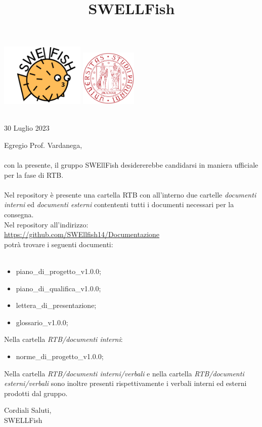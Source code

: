 \documentclass[12pt]{article}
\begin{document}
\graphicspath{ {../templates/img/} }
\title{SWELLFish}

\begin{center}
    \includegraphics[width=0.3\textwidth]{../templates/img/Swellfish_logo.png}
    \hspace{3cm}
    \includegraphics[width=0.2\textwidth]{../templates/img/logoUnipd.png}\\
    \end{center}
    \begin{flushright}
        \
        \textbf{}\\
        30 Luglio 2023
    \end{flushright}  

Egregio Prof. Vardanega,\\\\
con la presente, il gruppo SWEllFish desidererebbe candidarsi in maniera ufficiale
per la fase di RTB.\\\\
Nel repository è presente una cartella RTB con all'interno due cartelle \textit{documenti interni} ed \textit{documenti esterni} contententi tutti i documenti necessari per la consegna.\\
Nel repository all'indirizzo: \\
\href{https://github.com/SWEllfish14/Documentazione}{\underline{https://github.com/SWEllfish14/Documentazione}}\\ 
potrà trovare i seguenti documenti:\\\\

\begin{itemize}
\item piano\_di\_progetto\_v1.0.0;
\item piano\_di\_qualifica\_v1.0.0;
\item lettera\_di\_presentazione;
\item glossario\_v1.0.0;
\end{itemize}
Nella cartella \textit{RTB/documenti interni}:
\begin{itemize}
    \item norme\_di\_progetto\_v1.0.0;
\end{itemize}
 Nella cartella \textit{RTB/documenti interni/verbali} e nella cartella \textit{RTB/documenti esterni/verbali} sono inoltre presenti rispettivamente i verbali interni ed esterni prodotti dal gruppo. 

\begin{flushright}
Cordiali Saluti,\\
SWELLFish
\end{flushright}
\end{document}
